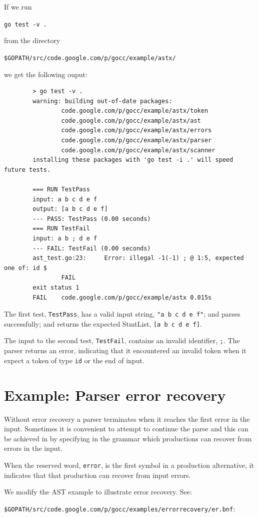 \documentclass[12pt]{article}
\begin{document}
	If we run 

	\verb"go test -v ." 

	from the directory 

	\verb|$GOPATH/src/code.google.com/p/gocc/example/astx/| 

	we get the following ouput:

	\begin{verbatim}
		> go test -v .
		warning: building out-of-date packages:
		        code.google.com/p/gocc/example/astx/token
		        code.google.com/p/gocc/example/astx/ast
		        code.google.com/p/gocc/example/astx/errors
		        code.google.com/p/gocc/example/astx/parser
		        code.google.com/p/gocc/example/astx/scanner
		installing these packages with 'go test -i .' will speed future tests.

		=== RUN TestPass
		input: a b c d e f
		output: [a b c d e f]
		--- PASS: TestPass (0.00 seconds)
		=== RUN TestFail
		input: a b ; d e f
		--- FAIL: TestFail (0.00 seconds)
		ast_test.go:23: 	Error: illegal -1(-1) ; @ 1:5, expected one of: id $
		        FAIL
		exit status 1
		FAIL	code.google.com/p/gocc/example/astx	0.015s	\end{verbatim}

	The first test, \verb"TestPass", has a valid input string, \verb|"a b c d e f"|; and parses successfully; and returns the expected StmtList, \verb|[a b c d e f]|.

	The input to the second test, \verb|TestFail|, contains an invalid identifier, \verb|;|. The parser returns an error, indicating that it encountered an invalid token when it expect a token of type \verb|id| or the end of input.

\section{Example: Parser error recovery} \label{sec:error recovery}
	Without error recovery a \gocc parser terminates when it reaches the first error in the input. Sometimes it is convenient to attempt to continue the parse and this can be achieved in \gocc by specifying in the grammar which productions can recover from errors in the input. 

	When the \gocc reserved word, \verb|error|, is the first symbol in a production alternative, it indicates that that production can recover from input errors.

	We modify the AST example to illustrate error recovery. See:

	\verb|$GOPATH/src/code.google.com/p/gocc/examples/errorrecovery/er.bnf|:
\end{document}

